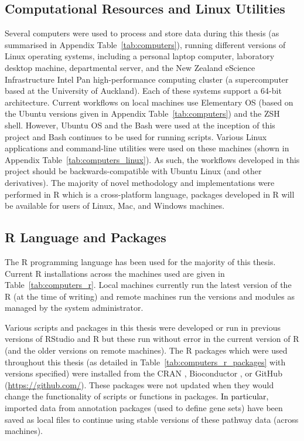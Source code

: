 \subsection{Computational Resources and Linux Utilities}

Several computers were used to process and store data during this thesis (as summarised in Appendix Table~\ref{tab:computers}), running different versions of Linux operating systems, including a personal laptop computer, laboratory desktop machine, departmental server, and the New Zealand eScience Infrastructure Intel Pan high-performance computing cluster (a supercomputer based at the University of Auckland). Each of these systems support a 64-bit architecture. Current workflows on local machines use Elementary OS (based on the Ubuntu versions given in Appendix Table~\ref{tab:computers}) and the ZSH shell. However, Ubuntu OS and the Bash were used at the inception of this project and Bash continues to be used for running scripts. Various Linux applications and command-line utilities were used on these machines (shown in Appendix Table~\ref{tab:computers_linux}). As such, the workflows developed in this project should be backwards-compatible with Ubuntu Linux (and other derivatives). The majority of novel methodology and implementations were performed in R which is a cross-platform language, packages developed in R will be available for users of Linux, Mac, and Windows machines.  


\FloatBarrier

\subsection{R Language and Packages}


The R programming language has been used for the majority of this thesis. Current R installations across the machines used are given in Table~\ref{tab:computers_r}. Local machines currently run the latest version of the R (at the time of writing) and remote machines run the versions and modules as managed by the system administrator.

Various scripts and packages in this thesis were developed or run in previous versions of RStudio and R but these run without error in the current version of R (and the older versions on remote machines). The R packages which were used throughout this thesis (as detailed in Table~\ref{tab:computers_r_packages} with versions specified) were installed from the \acrfull{CRAN} \citep{CRAN}, Bioconductor \citep[][version 3.4; BiocInstaller 1.24.0]{Gentleman2004}, or GitHub (\url{https://github.com/}). These packages were not updated when they would change the functionality of scripts or functions in packages\textcolor{black}{. In particular,} imported data from annotation packages (used to define gene sets) have been saved as local files to continue using stable versions of these \gls{pathway} data (across machines).

